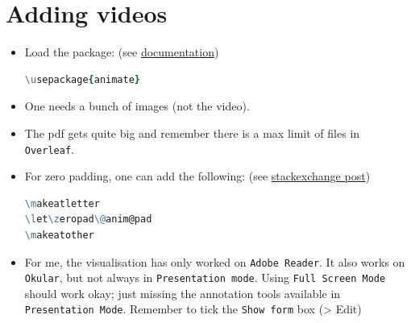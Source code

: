 \documentclass[aspectratio=1610,11pt]{beamer}
\makeatletter
\let\zeropad\@anim@pad
\makeatother
\begin{document}
\section{Adding videos}
\begin{frame}[fragile]{\insertsection}
    \begin{itemize}
        \item Load the package:  (see \href{http://ctan.unsw.edu.au/macros/latex/contrib/animate/animate.pdf}{documentation})
        \begin{lstlisting}[language=tcl,numbers=none]
\usepackage{animate} \end{lstlisting}
        \item One needs a bunch of images (not the video). 
        \item The pdf gets quite big and remember there is a  max limit of files in \texttt{Overleaf}.
        \item For zero padding, one can add the following: (see \href{https://tex.stackexchange.com/questions/86632/how-to-deal-with-zero-padding-using-multiframe-in-the-animate-package}{stackexchange post})
        \begin{lstlisting}[language=tcl,numbers=none]
\makeatletter
\let\zeropad\@anim@pad
\makeatother\end{lstlisting}
        \item For me, the visualisation has only worked on \texttt{Adobe Reader}. It also works on \texttt{Okular}, but not always in \texttt{Presentation mode}. Using \texttt{Full Screen Mode} should work okay; just missing the annotation tools available in \texttt{Presentation Mode}. Remember to tick the \texttt{Show form} box (> Edit)
    \end{itemize}
\end{frame}


\begin{frame}{\insertsection}
    \begin{animateinline}[poster=last,autoplay,autopause,loop,controls]{20}
    }
    \end{animateinline}
\end{frame}
\end{document}
